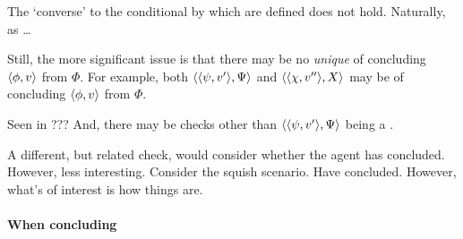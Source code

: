 \begin{note}
  The `converse' to the conditional by which  are defined does not hold.
  Naturally, as \fc{}\dots

  Still, the more significant issue is that there may be no \emph{unique}  of concluding \(\langle \phi, v \rangle\) from \(\Phi\).
  For example, both \(\langle \langle \psi, v' \rangle, \Psi \rangle\) and \(\langle \langle \chi, v'' \rangle, X \rangle\) may be  of concluding \(\langle \phi, v \rangle\) from \(\Phi\).

  {
    \color{red}
    Seen in ???
  }
  And, there may be checks other than \(\langle \langle \psi, v' \rangle, \Psi \rangle\) being a \curb{}.

  A different, but related check, would consider whether the agent has concluded.
  However, less interesting.
  Consider the squish scenario.
  Have concluded.
  However, what's of interest is how things are.
\end{note}






\paragraph{When concluding}

